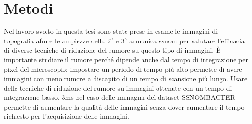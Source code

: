 \documentclass[../main.tex]{subfiles}
\begin{document}
\chapter{Metodi}

Nel lavoro svolto in questa tesi sono state prese in esame le immagini di topografia \acrshort{afm} e le ampiezze della $2^a$ e $3^a$ armonica \acrshort{ssnom} per valutare l'efficacia di diverse tecniche di riduzione del rumore su questo tipo di immagini. È importante studiare il rumore perché dipende anche dal tempo di integrazione per pixel del microscopio: impostare un periodo di tempo più alto permette di avere immagini con meno rumore a discapito di un tempo di scansione più lungo. Usare delle tecniche di riduzione del rumore su immagini ottenute con un tempo di integrazione basso, $3$ms nel caso delle immagini del dataset SSNOMBACTER, permette di aumentare la qualità delle immagini senza dover aumentare il tempo richiesto per l'acquisizione delle immagini.\cite{baiz_2025}
\end{document}
